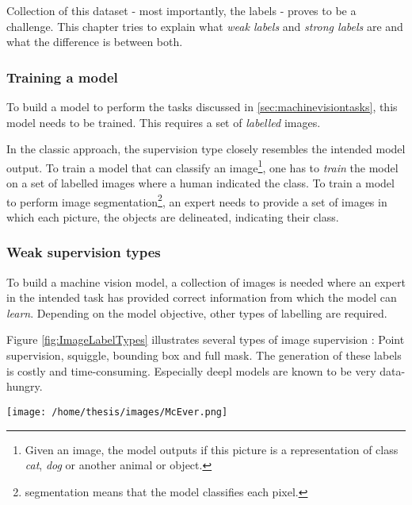 Collection of this dataset - most importantly, the labels - proves to be a challenge. 
This chapter tries to explain what \textit{weak labels} and \textit{strong labels} are and what the difference is between both.

\subsubsection{Training a model}

To build a model to perform the tasks discussed in \ref{sec:machinevisiontasks}, this model needs to be trained.
This requires a set of \textit{labelled} images. 

In the classic approach, the supervision type closely resembles the intended model output.
To train a model that can classify an image\footnote{Given an image, the model outputs if this picture is a representation of class \textit{cat}, \textit{dog} or another animal or object. }, 
one has to \textit{train} the model on a set of labelled images where a human indicated the class.
To train a model to perform image segmentation\footnote{segmentation means that the model classifies each pixel.}, an expert needs to provide a set of images in which
each picture, the objects are delineated, indicating their class.  



\subsubsection{Weak supervision types}


To build a machine vision model, a collection of images is needed where an expert in the intended task has provided correct information from which the model can \textit{learn}.
Depending on the model objective, other types of labelling are required.


Figure \ref{fig:ImageLabelTypes} illustrates several types of image supervision : 
Point supervision, squiggle, bounding box and full mask.
The generation of these labels is costly and time-consuming.
Especially \gls{deepl} models are known to be very data-hungry. 

\begin{SCfigure}[][htb]
    \centering
    \texttt{[image: /home/thesis/images/McEver.png]}
    \caption{Four different annotation types \cite{McEver2020}: 
    On the top left the picture is point level annotated. The points are inflated for visibility.
    On the top right, squiggle annotation is used.
    The bottom left shows bounding box supervion.
    While the bottom right image is fully annotated.
    An image level label would indicate that there are multiple instances of \textit{person} and \textit{bike} in the image.
    \label{fig:ImageLabelTypes}}
\end{SCfigure}

